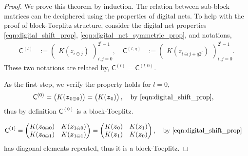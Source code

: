 \documentclass{iitthesis}          %
\newcommand{\bm}[1]{\boldsymbol{#1}}
\newcommand{\vz}{\bm{z}}
\newcommand{\mC}{\mathsf{C}}
\newcommand{\JRNote}[1]{{\textcolor{green}{JR: #1}}}
\begin{document}
\begin{proof}
	

We prove this theorem by induction.
The relation between sub-block matrices can be deciphered using the properties of digital nets.
To help with the proof of block-Toeplitz structure, consider the digital net properties \ref{eqn:digital_shift_prop},  \ref{eqn:digital_net_symmetric_prop},
and notations,
\begin{align*}
\mC^{(l)} &:= 
\begin{pmatrix}
K({z_{i \ominus j}})
\end{pmatrix}_{i,j=0}^{2^{l}-1},
\quad 
\mC^{(l,q)} &:= 
\begin{pmatrix}
K({z_{i \ominus j + q 2^l}})
\end{pmatrix}_{i,j=0}^{2^{l}-1}.
\end{align*}
These two notations are related by, $\mC^{(l)} = \mC^{(l,0)}$.


As the first step, we verify the property holds for $l=0$,
\begin{align*}
\mC^{(0)} &= \begin{pmatrix}
K(\vz_{0 \ominus 0})  
\end{pmatrix} = 
\begin{pmatrix}
K(\vz_{0})
\end{pmatrix}, \quad \text{by \ref{eqn:digital_shift_prop}},
\end{align*} thus by definition $\mC^{(0)}$ is a block-Toeplitz.

\iffalse
\begin{align*}
\mC^{(1)} &= \begin{pmatrix}
K(\vz_{0 \ominus 0}) & K(\vz_{1 \ominus 0})  \\
K(\vz_{0 \ominus 1}) & K(\vz_{1 \ominus 1})  
\end{pmatrix} = 
\begin{pmatrix}
K(\vz_{0}) & K(\vz_{1}) \\ K(\vz_{1}) & K(\vz_{0})
\end{pmatrix}, \quad \text{by \ref{eqn:digital_shift_prop}}
\end{align*} has diagonal elements repeated, thus it is a block-Toeplitz.
	

\end{proof}
\end{document}
